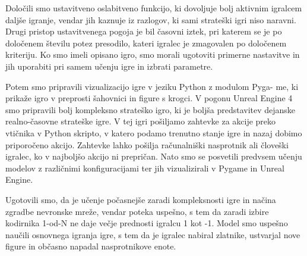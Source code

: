 \documentclass[a4paper, 12pt]{book}
\begin{document}
{Določili smo ustavitveno oslabitveno funkcijo, ki dovoljuje bolj aktivnim igralcem daljše igranje, vendar jih kaznuje iz razlogov, ki sami strateški igri niso naravni.
Drugi pristop ustavitvenega pogoja je bil časovni iztek, pri katerem se je po določenem številu potez presodilo, kateri igralec je zmagovalen po določenem kriteriju.
Ko smo imeli opisano igro, smo morali ugotoviti primerne nastavitve in jih uporabiti pri samem učenju igre in izbrati parametre.

Potem smo pripravili vizualizacijo igre v jeziku Python z modulom Pyga- me, ki prikaže igro v preprosti šahovnici in figure s krogci.
V pogonu Unreal Engine 4 smo pripravili bolj kompleksno strateško igro, ki je boljša predstavitev dejanske realno-časovne strateške igre.
V tej igri pošiljamo zahtevke za akcije preko vtičnika v Python skripto, v katero podamo trenutno stanje igre in nazaj dobimo priporočeno akcijo.
Zahtevke lahko pošilja računalniški nasprotnik ali človeški igralec, ko v najboljšo akcijo ni prepričan.
Nato smo se posvetili predvsem učenju modelov z različnimi konfiguracijami ter jih vizualizirali v Pygame in Unreal Engine.

Ugotovili smo, da je učenje počasnejše zaradi kompleksnosti igre in načina zgradbe nevronske mreže, vendar poteka uspešno, s tem da zaradi izbire kodirnika 1-od-N ne daje večje prednosti igralcu 1 kot -1.
Model smo uspešno naučili osnovnega igranja igre, s tem da je igralec nabiral zlatnike, ustvarjal nove figure in občasno napadal nasprotnikove enote.

}
\end{document}
